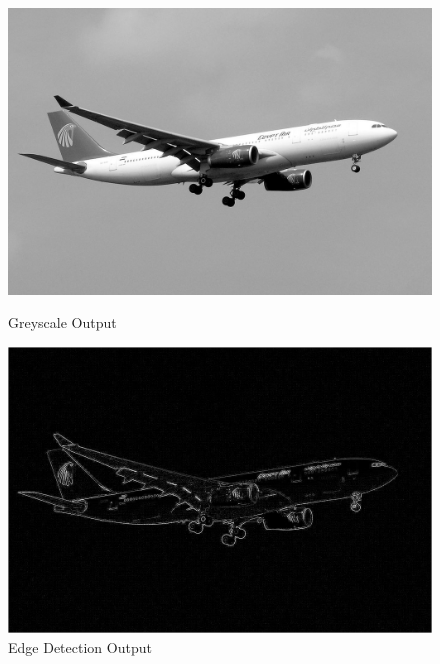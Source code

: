 \documentclass[12pt,a4paper]{report}
\begin{document}
\begin{figure}[!htb]
  \includegraphics[width=1\linewidth]{result_img/aeroplane_Q1.png}
  \caption{Greyscale Output}
  \includegraphics[width=1\linewidth]{result_img/aeroplane_Q2.png}
  \caption{Edge Detection Output}
\end{figure}
\end{document}
